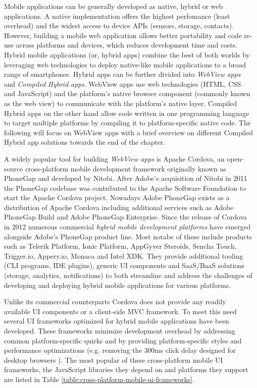 \documentclass[thesis.tex]{subfiles}
\begin{document}
Mobile applications can be generally developed as native, hybrid or web applications. A native implementation offers the highest perfomance (least overhead) and the widest access to device APIs (sensors, storage, contacts). However, building a mobile web application allows better portability and code re-use across platforms and devices, which reduces development time and costs. Hybrid mobile applications (or, hybrid apps) combine the best of both worlds by leveraging web technologies to deploy native-like mobile applications to a broad range of smartphones. Hybrid apps can be further divided into \textit{WebView apps} and \textit{Compiled Hybrid apps}. WebView apps use web technologies (HTML, CSS and JavaScript) and the platform's native browser component (commonly known as the web view) to communicate with the platform's native layer. Compiled Hybrid apps on the other hand allow code written in one programming language to target multiple platforms by compiling it to platform-specific native code. The following will focus on WebView apps with a brief overview on different Compiled Hybrid app solutions towards the end of the chapter.

A widely popular tool for building \textit{WebView apps} is Apache Cordova, an open-source cross-platform mobile development framework originally known as PhoneGap and developed by Nitobi. After Adobe's acquisition of Nitobi in 2011 the PhoneGap codebase was contributed to the Apache Software Foundation to start the Apache Cordova project. Nowadays Adobe PhoneGap exists as a distribution of Apache Cordova including additional services such as Adobe PhoneGap Build and Adobe PhoneGap Enterprise. Since the release of Cordova in 2012 numerous commercial \textit{hybrid mobile development platforms} have emerged alongside Adobe's PhoneGap product line. Most notabe of these include products such as Telerik Platform, Ionic Platform, AppGyver Steroids, Sencha Touch, Trigger.io, Appery.io, Monaca and Intel XDK. They provide additional tooling (CLI programs, IDE plugins), generic UI components and SaaS/BaaS solutions (storage, analytics, notifications) to both streamline and address the challenges of developing and deploying hybrid mobile applications for various platforms.

Unlike its commercial counterparts Cordova does not provide any readily available UI components or a client-side MVC framework. To meet this need several UI frameworks optimized for hybrid mobile applications have been developed. These frameworks minimize development overhead by addressing common platform-specific quirks and by providing platform-specific styles and performance optimizations (e.g. removing the 300ms click delay designed for desktop browsers \cite{click_delay}). The most popular of these cross-platform mobile UI frameworks, the JavaScript libraries they depend on and platforms they support are listed in Table \ref{table:cross-platform-mobile-ui-frameworks}.
\end{document}

